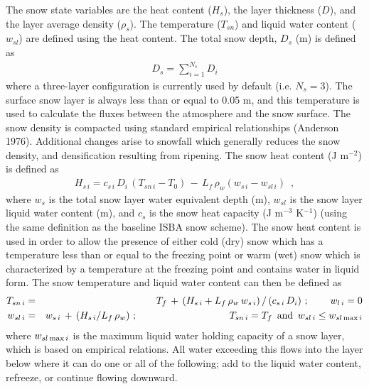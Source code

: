 The snow state variables are the heat content ($H_s$),
the layer thickness ($D$), and the layer average density ($\rho_s$).
The temperature ($T_{sn}$) and liquid water content ($w_{sl}$) are defined
using the heat content.
The total snow depth, $D_s$ (m) is defined as
%
\begin{eqnarray}
D_s = \sum_{i=1}^{N_s} D_i
\end{eqnarray}
%
where a three-layer configuration is currently used by default (i.e. $N_s=3$).
The surface snow layer is always less than or equal to 0.05 m, and this
temperature is used to calculate the fluxes between the atmosphere
and the snow surface.
The snow density is compacted using standard empirical relationships
(Anderson 1976). Additional changes arise to snowfall which
generally reduces the snow density, and densification resulting from ripening.
The snow heat content (J m$^{-2}$) is defined as
%
\begin{eqnarray}
H_{s\,i} = c_{s\,i}\,D_i\,\left(T_{sn\,i}-T_0\right)
\,-\, L_f\,\rho_w \left(w_{s\,i}- w_{sl\,i}\right)\,\,\,,
\end{eqnarray}
%
where $w_s$ is the total snow layer water equivalent depth (m),
$w_{sl}$ is the snow layer liquid water content (m), and $c_s$
is the snow heat capacity (J m$^{-3}$ K$^{-1}$) (using the same
definition as the baseline ISBA snow scheme).
The snow heat content is used in order to allow
the presence of either
cold (dry) snow which has a temperature less
than or equal to the freezing point
or warm (wet)
snow which is characterized by a temperature at the freezing point
and contains water in liquid form.
The snow temperature
and liquid water content can then be defined as
%
\begin{eqnarray}
T_{sn\,i} &=& T_f \,+\, \left(H_{s\,i}  + L_f\,\rho_w\,w_{s\,i}\right)
/\left(c_{s\,i}\,D_i \right) \,;
\hskip.3in
w_{l\,i} = 0 \\
%
w_{sl\,i} &=& w_{s\,i} \,+\, \left(H_{s\,i}/L_f\,\rho_w\right) \,;
\hskip1.3in
T_{sn\,i} = T_f \,\,\,{\rm and} \,\,\, w_{sl\,i} \leq w_{sl\,{\rm max}\,i}
\end{eqnarray}
%
where $w_{sl\,{\rm max}\,i}$ is the maximum liquid water
holding capacity of a snow layer,
which is based on empirical relations. All
water exceeding this flows into the layer below where
it can do one or all of the following;
add to the liquid water content, refreeze, or continue
flowing downward.

